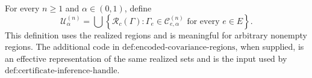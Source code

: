 For every \(n\geq1\) and \(\alpha\in(0,1)\), define
\[
 \mathcal U^{(n)}_\alpha
 =\bigcup\left\{
   \mathcal R_c(\Gamma):
   \Gamma_e\in\mathcal C^{(n)}_{e,\alpha}
   \text{ for every }e\in E
 \right\}.
\]
This definition uses the realized regions and is meaningful for arbitrary nonempty regions.  The additional code in \(\text{def:encoded-covariance-regions}\), when supplied, is an effective representation of the same realized sets and is the input used by \(\text{def:certificate-inference-handle}\).